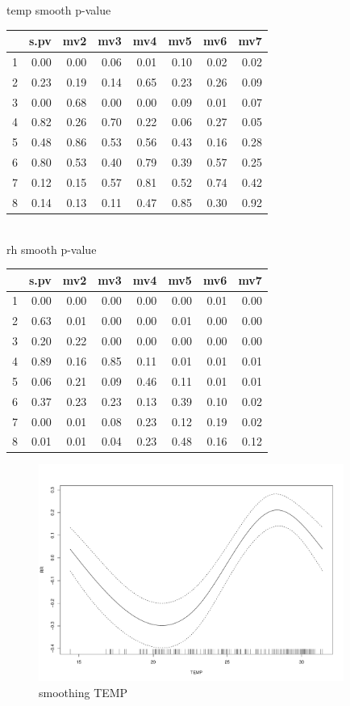 \documentclass[a4paper, 12pt]{article}
\begin{document}
\clearpage
temp smooth p-value
\begin{table}[ht]
\centering
\begin{tabular}{rrrrrrrr}
  \hline
 & s.pv & mv2 & mv3 & mv4 & mv5 & mv6 & mv7 \\
  \hline
1 & 0.00 & 0.00 & 0.06 & 0.01 & 0.10 & 0.02 & 0.02 \\
  2 & 0.23 & 0.19 & 0.14 & 0.65 & 0.23 & 0.26 & 0.09 \\
  3 & 0.00 & 0.68 & 0.00 & 0.00 & 0.09 & 0.01 & 0.07 \\
  4 & 0.82 & 0.26 & 0.70 & 0.22 & 0.06 & 0.27 & 0.05 \\
  5 & 0.48 & 0.86 & 0.53 & 0.56 & 0.43 & 0.16 & 0.28 \\
  6 & 0.80 & 0.53 & 0.40 & 0.79 & 0.39 & 0.57 & 0.25 \\
  7 & 0.12 & 0.15 & 0.57 & 0.81 & 0.52 & 0.74 & 0.42 \\
  8 & 0.14 & 0.13 & 0.11 & 0.47 & 0.85 & 0.30 & 0.92 \\
   \hline
\end{tabular}
\end{table}
\\
rh smooth p-value
\begin{table}[ht]
\centering
\begin{tabular}{rrrrrrrr}
  \hline
 & s.pv & mv2 & mv3 & mv4 & mv5 & mv6 & mv7 \\
  \hline
1 & 0.00 & 0.00 & 0.00 & 0.00 & 0.00 & 0.01 & 0.00 \\
  2 & 0.63 & 0.01 & 0.00 & 0.00 & 0.01 & 0.00 & 0.00 \\
  3 & 0.20 & 0.22 & 0.00 & 0.00 & 0.00 & 0.00 & 0.00 \\
  4 & 0.89 & 0.16 & 0.85 & 0.11 & 0.01 & 0.01 & 0.01 \\
  5 & 0.06 & 0.21 & 0.09 & 0.46 & 0.11 & 0.01 & 0.01 \\
  6 & 0.37 & 0.23 & 0.23 & 0.13 & 0.39 & 0.10 & 0.02 \\
  7 & 0.00 & 0.01 & 0.08 & 0.23 & 0.12 & 0.19 & 0.02 \\
  8 & 0.01 & 0.01 & 0.04 & 0.23 & 0.48 & 0.16 & 0.12 \\
   \hline
\end{tabular}
\end{table}

\clearpage
\begin{figure}
       \includegraphics[width=10cm]{TEMPSMOOTH}
      \caption{smoothing TEMP}
\end{figure}
\end{document}
